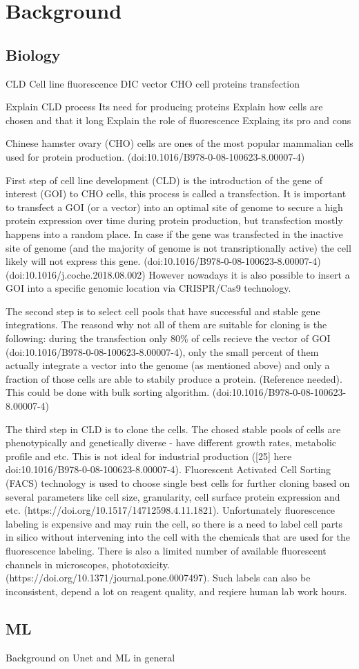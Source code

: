\section{Background}
\subsection{Biology}
CLD
Cell line
fluorescence
DIC
vector
CHO cell
proteins
transfection

Explain CLD process
Its need for producing proteins
Explain how cells are chosen and that it long
Explain the role of fluorescence
Explaing its pro and cons

Chinese hamster ovary (CHO) cells are ones of the most popular mammalian cells used for protein production. (doi:10.1016/B978-0-08-100623-8.00007-4) 

First step of cell line development (CLD) is the
introduction of the gene of interest (GOI) to CHO cells, this process is called a transfection. It is important to transfect a GOI (or a vector) into an optimal site of genome to secure a high protein expression over time during protein production, but transfection mostly happens into a random place. In case if the gene was transfected in the inactive site of genome (and the majority of genome is not transriptionally active) the cell likely will not express this gene. (doi:10.1016/B978-0-08-100623-8.00007-4) (doi:10.1016/j.coche.2018.08.002) However nowadays it is also possible to insert a GOI into a specific genomic location via CRISPR/Cas9 technology. 

The second step is to select cell pools that have successful and stable gene integrations. The reasond why not all of them are suitable for cloning is the following: during the transfection only 80\% of cells recieve the vector of GOI (doi:10.1016/B978-0-08-100623-8.00007-4), only the small percent of them actually integrate a vector into the genome (as mentioned above) and only a fraction of those cells are able to stabily produce a protein. (Reference needed). This could be done with bulk sorting algorithm. (doi:10.1016/B978-0-08-100623-8.00007-4)

The third step in CLD is to clone the cells. The chosed stable pools of cells are phenotypically and genetically diverse - have different growth rates, metabolic profile and etc. This is not ideal for industrial production ([25] here doi:10.1016/B978-0-08-100623-8.00007-4). Fluorescent Activated Cell Sorting (FACS) technology is used to choose single best cells for further cloning based on several parameters like cell size, granularity, cell surface protein expression and etc. (https://doi.org/10.1517/14712598.4.11.1821). Unfortunately fluorescence labeling is expensive and may ruin the cell, so there is a need to label cell parts in silico without intervening into the cell with the chemicals that are used for the fluorescence labeling. There is also a limited number of available fluorescent channels in microscopes, phototoxicity. (https://doi.org/10.1371/journal.pone.0007497). Such labels can also be inconsistent, depend a lot on reagent quality, and reqiere human lab work hours.

\subsection{ML}
Background on Unet and ML in general